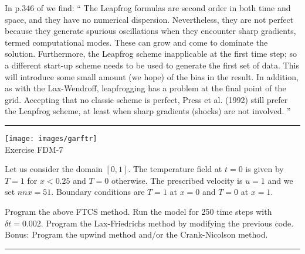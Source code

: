 In p.346 of \cite{boudreau} we find:
``
The Leapfrog formulas are second order in both time and space, and they have no
numerical dispersion. Nevertheless, they are not perfect because they generate
spurious oscillations when they encounter sharp gradients, termed computational
modes. These can grow and come to dominate the solution. Furthermore, the
Leapfrog scheme inapplicable at the first time step; so a different start-up scheme
needs to be used to generate the first set of data. This will introduce some small
amount (we hope) of the bias in the result. In addition, as with the Lax-Wendroff,
leapfrogging has a problem at the final point of the grid. Accepting that no classic
scheme is perfect, Press et al. (1992) still prefer the Leapfrog scheme, at least when
sharp gradients (shocks) are not involved.
''




\begin{center}
\begin{minipage}[t]{0.77\textwidth}
\par\noindent\rule{\textwidth}{0.4pt}

\begin{center}
\texttt{[image: images/garftr]} \\
{\color{orange}Exercise FDM-7}
\end{center}

Let us consider the domain $[0,1]$. The temperature field at $t=0$ is 
given by $T=1$ for $x<0.25$ and $T=0$ otherwise. The prescribed 
velocity is $u=1$ and we set $nnx=51$.
Boundary conditions are $T=1$ at $x=0$ and $T=0$ at $x=1$.

\begin{center}

\end{center}

Program the above FTCS method. Run the model for 250 time steps with $\delta t=0.002$. 
Program the Lax-Friedrichs method by modifying the previous code.\\
Bonus: Program the upwind method and/or the Crank-Nicolson method. 

\par\noindent\rule{\textwidth}{0.4pt}
\end{minipage}
\end{center}



